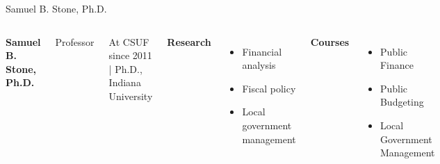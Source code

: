 \documentclass[10pt]{beamer}
\newlength{\imageheight}
\begin{document}
\begin{frame}{Samuel B. Stone, Ph.D.}
\begin{columns}[T,onlytextwidth]
    \raggedright
    {\large\bfseries Samuel B. Stone, Ph.D.}\par
    {Professor}\par
    {\footnotesize At CSUF since 2011 \quad | \quad Ph.D., Indiana University}\par\vspace{0.4em}

    \textbf{Research}
    \begin{itemize}
      \item Financial analysis
      \item Fiscal policy
      \item Local government management
    \end{itemize}

    \textbf{Courses}
    \begin{itemize}
      \item Public Finance
      \item Public Budgeting
      \item Local Government Management
    \end{itemize}

    \vspace*{0.25cm}
    \includegraphics[height=\imageheight]{images/stone.jpg}
\end{columns}
\end{frame}
\end{document}
